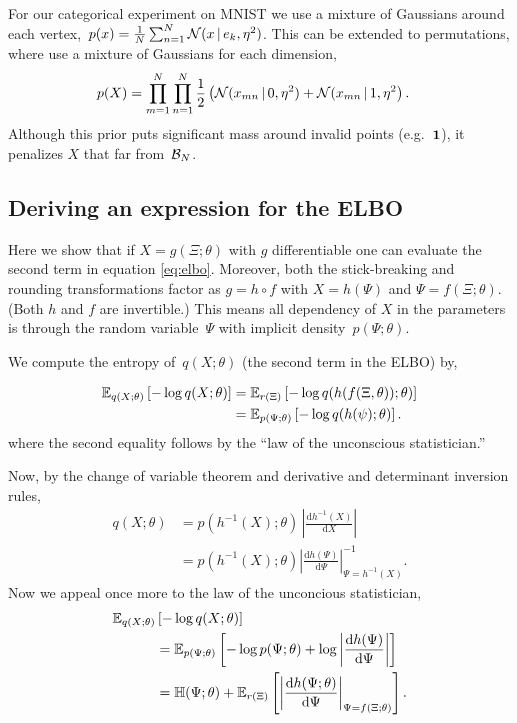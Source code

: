 \documentclass[twoside]{article}
\begin{document}
For our categorical experiment on MNIST we use a mixture of Gaussians
around each
vertex,~${p(x) = \tfrac{1}{N} \sum_{n=1}^N \mathcal{N}(x \, | \, e_k,
  \eta^2)}$.  This can be extended to permutations, where use a
mixture of Gaussians for each dimension,
\begin{align}
\label{eq:permprior}
  \nonumber p(X) &= \prod_{m=1}^N \prod_{n=1}^N
  \frac{1}{2} \left(\mathcal{N}(x_{mn} \, | \, 0, \eta^2) + \mathcal{N}(x_{mn} \, | \, 1, \eta^2 \right).
  \end{align}
Although this prior puts significant mass around invalid points
(e.g.~$\boldsymbol{1}$), it penalizes $X$ that far from~$\mathcal{B}_N$.

\subsection{Deriving an expression for the ELBO}
Here we show that if $X=g(\Xi;\theta)$ with $g$ differentiable one can
evaluate the second term in equation \eqref{eq:elbo}.  Moreover, both
the stick-breaking and rounding transformations factor as
${g=h \circ f}$ with ${X = h(\Psi)}$ and ${\Psi = f(\Xi; \theta)}$.
(Both $h$ and $f$ are invertible.) This means all dependency of $X$ in
the parameters is through the random variable~$\Psi$ with implicit
density~$p(\Psi; \theta)$.

We compute the entropy of~$q(X; \theta)$ (the second term in the ELBO)
by,

\begin{align*}
  \mathbb{E}_{q(X; \theta)} \left[- \log q(X; \theta) \right]
  &=
    \mathbb{E}_{r(\Xi)} \left[- \log q(h(f(\Xi,\theta)); \theta) \right] \\
  &= \mathbb{E}_{p(\Psi;\theta)} \left[- \log q(h(\psi); \theta) \right]. 
\end{align*}
where the second equality follows by the ``law of the unconscious statistician.''

Now, by the change of variable theorem and derivative and determinant
inversion rules,
\begin{align*}
  q(X; \theta)
  &= p(h^{-1}(X) ;\theta) \,
    \left| \frac{\mathrm{d} h^{-1}(X)}{\mathrm{d}X} \right| \\
  &= p(h^{-1}(X); \theta)
    \left| \frac{\mathrm{d}h(\Psi)}{\mathrm{d}\Psi} \right|^{-1}_{\Psi = h^{-1}(X)}.
 \end{align*}
Now we appeal once more to the law of the unconcious statistician,
\begin{align*}
  \mathbb{E}_{q(X; \theta)}& \left[- \log q(X; \theta) \right] \\
  &= \mathbb{E}_{p(\Psi;\theta)} \left[ - \log p(\Psi;\theta) +
     \log \left| \frac{\mathrm{d} h(\Psi)}{\mathrm{d}\Psi} \right| \right] \\
  &= \mathbb{H}(\Psi; \theta)  +
  \mathbb{E}_{r(\Xi)}\left[\left| \frac{\mathrm{d}h(\Psi; \theta)}{\mathrm{d}\Psi} \right|_{\Psi = f(\Xi; \theta)} \right].
\end{align*}
 
\end{document}
